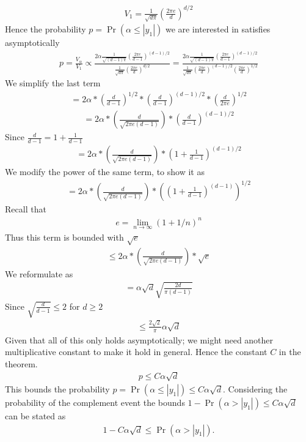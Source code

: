 \documentclass[a4paper, english, headtopline=0.08em, headsepline=0.04em, left = 1cm, right = 1cm, DIV=15]{article}
\begin{document}
\begin{align*}
	V_1 = \frac{1}{\sqrt{d\pi}}\left(\frac{2 \pi e}{d}\right)^{d/2}
\end{align*}
Hence the probability $p=\Pr(\alpha \leq|y_1|)$ we are interested in satisfies asymptotically
\begin{align*}
	p=\frac{V_\alpha}{V_1} \propto
\frac{2\alpha\frac{1}{\sqrt{(d-1)\pi}}\left(\frac{2 \pi e}{d-1}\right)^{(d-1)/2}}
 {\frac{1}{\sqrt{d\pi}}\left(\frac{2 \pi e}{d}\right)^{d/2}}
=
\frac{2\alpha\frac{1}{\sqrt{(d-1)\pi}}\left(\frac{2 \pi e}{d-1}\right)^{(d-1)/2}}
{\frac{1}{\sqrt{d\pi}}\left(\frac{2 \pi e}{d}\right)^{(d-1)/2}\left(\frac{2 \pi e}{d}\right)^{1/2}}
\end{align*}
We simplify the last term
\begin{align*}
	=2\alpha* \left(\frac{d}{d-1}\right)^{1/2} *   \left(\frac{d}{d-1}\right)^{(d-1)/2} * \left(\frac{d}{2\pi e}\right)^{1/2}
\end{align*}
\begin{align*}
	=2\alpha*  \left(\frac{d}{\sqrt{2\pi e (d-1)}}\right) *   \left(\frac{d}{d-1}\right)^{(d-1)/2}
\end{align*}
 Since $\frac{d}{d-1} = 1+\frac{1}{d-1}$
\begin{align*}
	=2\alpha*  \left(\frac{d}{\sqrt{2\pi e (d-1)}}\right) *   \left(1+\frac{1}{d-1}\right)^{(d-1)/2}
\end{align*}
We modify the power of the same term, to show it as
\begin{align*}
	=2\alpha*  \left(\frac{d}{\sqrt{2\pi e (d-1)}}\right) *   \left(\left(1+\frac{1}{d-1}\right)^{(d-1)}\right)^{1/2}
\end{align*}
Recall that 
\begin{align*}
	e = \lim_{n \rightarrow \infty} \left(1+1/n\right)^n
\end{align*}
Thus this term is bounded with $\sqrt{e}$
\begin{align*}
	\leq 2\alpha*  \left(\frac{d}{\sqrt{2\pi e (d-1)}}\right) *   \sqrt{e}
\end{align*}
We reformulate as
\begin{align*}
	= \alpha \sqrt{d}\sqrt{\frac{2d}{\pi(d-1)}}
\end{align*}
Since $\sqrt{\frac{d}{d-1}}\leq 2$ for $d\geq 2$
\begin{align*}
	\leq \frac{2\sqrt{2}}{\pi}\alpha \sqrt{d} 
\end{align*}
Given that all of this only holds asymptotically; we might need another multiplicative constant to make it hold in general. Hence the constant $C$ in the theorem.
\begin{align*}
	p \leq  C\alpha \sqrt{d}
\end{align*}
This bounds the probability $p = \Pr(\alpha \leq|y_1|) \leq  C\alpha \sqrt{d}$. Considering the probability of the complement event
the bounds $1-\Pr(\alpha > |y_1|) \leq  C\alpha \sqrt{d}$ can be stated as 
\begin{align*}
	1-C\alpha \sqrt{d} \leq \Pr(\alpha > |y_1|).
\end{align*}
\end{document}
